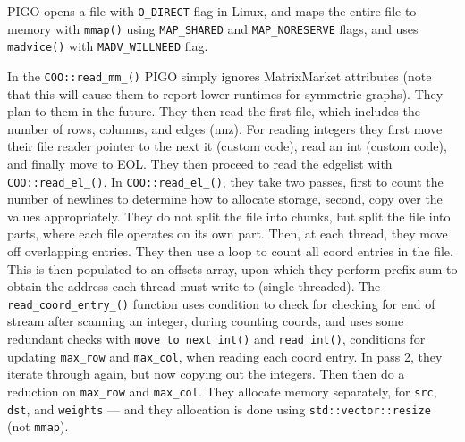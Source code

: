 PIGO opens a file with \texttt{O\_DIRECT} flag in Linux, and maps the entire file to memory with \texttt{mmap()} using \texttt{MAP\_SHARED} and \texttt{MAP\_NORESERVE} flags, and uses \texttt{madvice()} with \texttt{MADV\_WILLNEED} flag.

In the \texttt{COO::read\_mm\_()} PIGO simply ignores MatrixMarket attributes (note that this will cause them to report lower runtimes for symmetric graphs). They plan to them in the future. They then read the first file, which includes the number of rows, columns, and edges (nnz). For reading integers they first move their file reader pointer to the next it (custom code), read an int (custom code), and finally move to EOL. They then proceed to read the edgelist with \texttt{COO::read\_el\_()}. In \texttt{COO::read\_el\_()}, they take two passes, first to count the number of newlines to determine how to allocate storage, second, copy over the values appropriately. They do not split the file into chunks, but split the file into parts, where each file operates on its own part. Then, at each thread, they move off overlapping entries. They then use a loop to count all coord entries in the file. This is then populated to an offsets array, upon which they perform prefix sum to obtain the address each thread must write to (single threaded). The \texttt{read\_coord\_entry\_()} function uses condition to check for checking for end of stream after scanning an integer, during counting coords, and uses some redundant checks with \texttt{move\_to\_next\_int()} and \texttt{read\_int()}, conditions for updating \texttt{max\_row} and \texttt{max\_col}, when reading each coord entry. In pass 2, they iterate through again, but now copying out the integers. Then then do a reduction on \texttt{max\_row} and \texttt{max\_col}. They allocate memory separately, for \texttt{src}, \texttt{dst}, and \texttt{weights} --- and they allocation is done using \texttt{std::vector::resize} (not \texttt{mmap}).

